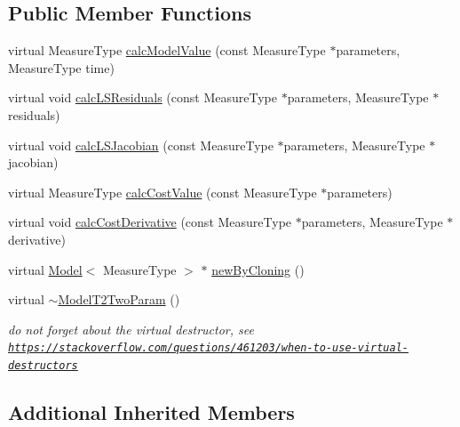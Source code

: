 \subsection*{Public Member Functions}
\begin{DoxyCompactItemize}
\item 
virtual Measure\-Type \hyperlink{class_ox_1_1_model_t2_two_param_a1401dbd94a7a23903f22013af44c4648}{calc\-Model\-Value} (const Measure\-Type $\ast$parameters, Measure\-Type time)
\item 
virtual void \hyperlink{class_ox_1_1_model_t2_two_param_a7f4e4edc966189fb95f6fcbbd6417c5f}{calc\-L\-S\-Residuals} (const Measure\-Type $\ast$parameters, Measure\-Type $\ast$residuals)
\item 
virtual void \hyperlink{class_ox_1_1_model_t2_two_param_af056e278a340918eb57f23f63ba2f23c}{calc\-L\-S\-Jacobian} (const Measure\-Type $\ast$parameters, Measure\-Type $\ast$jacobian)
\item 
virtual Measure\-Type \hyperlink{class_ox_1_1_model_t2_two_param_abd88af16b5860a18632453ca1ce858b4}{calc\-Cost\-Value} (const Measure\-Type $\ast$parameters)
\item 
virtual void \hyperlink{class_ox_1_1_model_t2_two_param_a4957d8cf05666364c6c21483fd0f9fa9}{calc\-Cost\-Derivative} (const Measure\-Type $\ast$parameters, Measure\-Type $\ast$derivative)
\item 
virtual \hyperlink{class_ox_1_1_model}{Model}$<$ Measure\-Type $>$ $\ast$ \hyperlink{class_ox_1_1_model_t2_two_param_a64afe7ef809a611d93df0d8f695f1a22}{new\-By\-Cloning} ()
\item 
\hypertarget{class_ox_1_1_model_t2_two_param_aa6ff3c3c4b24a3479c8ed6f3490f12ed}{virtual \hyperlink{class_ox_1_1_model_t2_two_param_aa6ff3c3c4b24a3479c8ed6f3490f12ed}{$\sim$\-Model\-T2\-Two\-Param} ()}\label{class_ox_1_1_model_t2_two_param_aa6ff3c3c4b24a3479c8ed6f3490f12ed}

\begin{DoxyCompactList}\small\item\em do not forget about the virtual destructor, see \href{https://stackoverflow.com/questions/461203/when-to-use-virtual-destructors}{\tt https\-://stackoverflow.\-com/questions/461203/when-\/to-\/use-\/virtual-\/destructors} \end{DoxyCompactList}\end{DoxyCompactItemize}
\subsection*{Additional Inherited Members}


